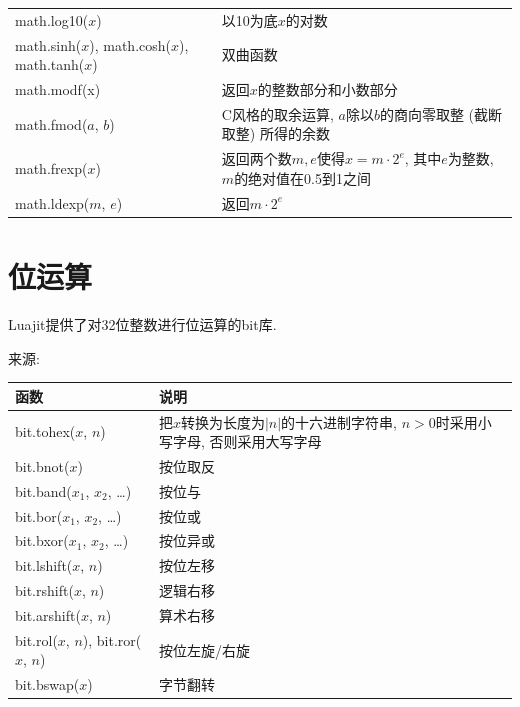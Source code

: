 \begin{center}
\begin{xltabular}{\textwidth}{XX}
    math.log10($x$) &
    以10为底$x$的对数 \\

    math.sinh($x$), math.cosh($x$), math.tanh($x$) &
    双曲函数 \\

    math.modf(x) &
    返回$x$的整数部分和小数部分 \\

    math.fmod($a$, $b$) &
    C风格的取余运算, $a$除以$b$的商向零取整
    (截断取整) 所得的余数 \\

    math.frexp($x$) &
    返回两个数$m,e$使得$x = m\cdot2^e$,
    其中$e$为整数, $m$的绝对值在0.5到1之间 \\

    math.ldexp($m$, $e$) &
    返回$m\cdot2^e$ \\
    \bottomrule
  \end{xltabular}
\end{center}

\section{位运算}

Luajit提供了对32位整数进行位运算的bit库.

来源: 

\begin{center}
  \begin{xltabular}{\textwidth}{XX}
    \toprule
    函数 & 说明 \\
    \midrule

    bit.tohex($x$, $n$) &
    把$x$转换为长度为$|n|$的十六进制字符串,
    $n>0$时采用小写字母, 否则采用大写字母 \\

    bit.bnot($x$) &
    按位取反 \\

    bit.band($x_1$, $x_2$, \dots) &
    按位与 \\

    bit.bor($x_1$, $x_2$, \dots) &
    按位或 \\

    bit.bxor($x_1$, $x_2$, \dots) &
    按位异或 \\

    bit.lshift($x$, $n$) &
    按位左移 \\

    bit.rshift($x$, $n$) &
    逻辑右移 \\

    bit.arshift($x$, $n$) &
    算术右移 \\

    bit.rol($x$, $n$), bit.ror($x$, $n$) &
    按位左旋/右旋 \\

    bit.bswap($x$) &
    字节翻转 \\
    \bottomrule
  \end{xltabular}
\end{center}


